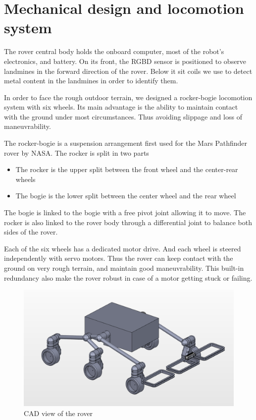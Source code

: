 \section{Mechanical design and locomotion system}
The rover central body holds the onboard computer, most of the robot's electronics, and battery.
On its front, the RGBD sensor is positioned to observe landmines in the forward direction of the rover.
Below it sit coils we use to detect metal content in the landmines in order to identify them.

In order to face the rough outdoor terrain, we designed a rocker-bogie locomotion system with six wheels.
Its main advantage is the ability to maintain contact with the ground under most circumstances.
Thus avoiding slippage and loss of maneuvrability.

The rocker-bogie is a suspension arrangement first used for the Mars Pathfinder rover by NASA.
The rocker is split in two parts
\begin{itemize}
    \item The rocker is the upper split between the front wheel and the center-rear wheels
    \item The bogie is the lower split between the center wheel and the rear wheel
\end{itemize}
The bogie is linked to the bogie with a free pivot joint allowing it to move.
The rocker is also linked to the rover body through a differential joint to balance both sides of the rover.

Each of the six wheels has a dedicated motor drive.
And each wheel is steered independently with servo motors.
Thus the rover can keep contact with the ground on very rough terrain, and maintain good maneuvrability.
This built-in redundancy also make the rover robust in case of a motor getting stuck or failing.

\begin{figure}[htbp]
   \caption{\label{fig:rover} CAD view of the rover}
   \includegraphics[width=\textwidth]{images/rover}
\end{figure}

